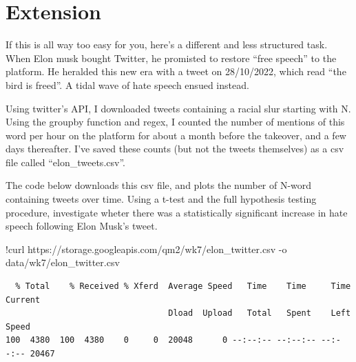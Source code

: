 \documentclass[
  letterpaper,
  DIV=11,
  numbers=noendperiod]{scrreprt}
\newenvironment{Shaded}{\begin{snugshade}}{\end{snugshade}}
\newcommand{\NormalTok}[1]{\textcolor[rgb]{0.00,0.23,0.31}{#1}}
\newcommand{\OperatorTok}[1]{\textcolor[rgb]{0.37,0.37,0.37}{#1}}
\begin{document}
\hypertarget{extension-2}{%
\section{Extension}\label{extension-2}}

If this is all way too easy for you, here's a different and less
structured task. When Elon musk bought Twitter, he promisted to restore
``free speech'' to the platform. He heralded this new era with a tweet
on 28/10/2022, which read ``the bird is freed''. A tidal wave of hate
speech ensued instead.

Using twitter's API, I downloaded tweets containing a racial slur
starting with N. Using the groupby function and regex, I counted the
number of mentions of this word per hour on the platform for about a
month before the takeover, and a few days thereafter. I've saved these
counts (but not the tweets themselves) as a csv file called
``elon\_tweets.csv''.

The code below downloads this csv file, and plots the number of N-word
containing tweets over time. Using a t-test and the full hypothesis
testing procedure, investigate wheter there was a statistically
significant increase in hate speech following Elon Musk's tweet.

\begin{Shaded}
\begin{Highlighting}[]
\OperatorTok{!}\NormalTok{curl https:}\OperatorTok{//}\NormalTok{storage.googleapis.com}\OperatorTok{/}\NormalTok{qm2}\OperatorTok{/}\NormalTok{wk7}\OperatorTok{/}\NormalTok{elon\_twitter.csv }\OperatorTok{{-}}\NormalTok{o data}\OperatorTok{/}\NormalTok{wk7}\OperatorTok{/}\NormalTok{elon\_twitter.csv}
\end{Highlighting}
\end{Shaded}

\begin{verbatim}
  % Total    % Received % Xferd  Average Speed   Time    Time     Time  Current
                                 Dload  Upload   Total   Spent    Left  Speed
100  4380  100  4380    0     0  20048      0 --:--:-- --:--:-- --:--:-- 20467
\end{verbatim}
\end{document}

